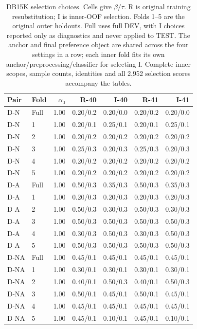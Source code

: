 \begin{table}[htbp]
\centering\footnotesize\setlength{\tabcolsep}{3pt}
\caption{DB15K selection choices. Cells give $\beta/\tau$. R is original training resubstitution; I is inner-OOF selection. Folds 1--5 are the original outer holdouts. Full uses full DEV, with I choices reported only as diagnostics and never applied to TEST. The anchor and final preference object are shared across the four settings in a row; each inner fold fits its own anchor/preprocessing/classifier for selecting I. Complete inner scopes, sample counts, identities and all 2,952 selection scores accompany the tables.}
\label{tab:selection-choices-db15k}
\begin{tabular}{llrrrrr}
\toprule
Pair & Fold & $\alpha_0$ & R-40 & I-40 & R-41 & I-41\\
\midrule
D-N & Full & 1.00 & 0.20/0.2 & 0.20/0.0 & 0.20/0.2 & 0.20/0.0\\
D-N & 1 & 1.00 & 0.20/0.1 & 0.25/0.1 & 0.20/0.1 & 0.25/0.1\\
D-N & 2 & 1.00 & 0.20/0.2 & 0.20/0.2 & 0.20/0.2 & 0.20/0.2\\
D-N & 3 & 1.00 & 0.25/0.3 & 0.20/0.3 & 0.25/0.3 & 0.20/0.3\\
D-N & 4 & 1.00 & 0.20/0.2 & 0.20/0.2 & 0.20/0.2 & 0.20/0.2\\
D-N & 5 & 1.00 & 0.20/0.2 & 0.20/0.2 & 0.20/0.2 & 0.20/0.2\\
D-A & Full & 1.00 & 0.50/0.3 & 0.35/0.3 & 0.50/0.3 & 0.35/0.3\\
D-A & 1 & 1.00 & 0.20/0.3 & 0.20/0.3 & 0.20/0.3 & 0.20/0.3\\
D-A & 2 & 1.00 & 0.50/0.3 & 0.30/0.3 & 0.50/0.3 & 0.30/0.3\\
D-A & 3 & 1.00 & 0.50/0.3 & 0.50/0.3 & 0.50/0.3 & 0.50/0.3\\
D-A & 4 & 1.00 & 0.30/0.3 & 0.50/0.3 & 0.30/0.3 & 0.50/0.3\\
D-A & 5 & 1.00 & 0.50/0.3 & 0.50/0.3 & 0.50/0.3 & 0.50/0.3\\
D-NA & Full & 1.00 & 0.45/0.1 & 0.45/0.1 & 0.45/0.1 & 0.45/0.1\\
D-NA & 1 & 1.00 & 0.30/0.1 & 0.30/0.1 & 0.30/0.1 & 0.30/0.1\\
D-NA & 2 & 1.00 & 0.40/0.1 & 0.50/0.3 & 0.40/0.1 & 0.50/0.3\\
D-NA & 3 & 1.00 & 0.50/0.1 & 0.45/0.1 & 0.50/0.1 & 0.45/0.1\\
D-NA & 4 & 1.00 & 0.45/0.1 & 0.45/0.1 & 0.45/0.1 & 0.45/0.1\\
D-NA & 5 & 1.00 & 0.45/0.1 & 0.10/0.1 & 0.45/0.1 & 0.10/0.1\\
\bottomrule
\end{tabular}
\end{table}
